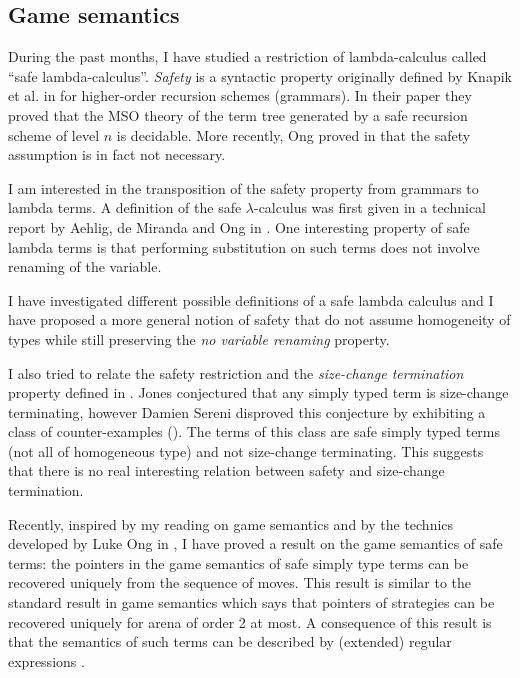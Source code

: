 %

\subsection{Game semantics}

During the past months, I have studied a restriction of
lambda-calculus called ``safe lambda-calculus''. \emph{Safety} is a
syntactic property originally defined by Knapik et al. in
\cite{KNU02} for higher-order recursion schemes (grammars). In their
paper they proved that the MSO theory of the term tree generated by
a safe recursion scheme of level $n$ is decidable. More recently,
Ong proved in \cite{OngLics2006} that the safety assumption is in
fact not necessary.

I am interested in the transposition of the safety property from
grammars to lambda terms. A definition of the safe
$\lambda$-calculus was first given in a technical report by Aehlig,
de Miranda and Ong in \cite{safety-mirlong2004}. One interesting
property of safe lambda terms is that performing substitution on
such terms does not involve renaming of the variable.

I have investigated different possible definitions of a safe lambda
calculus and I have proposed a more general notion of safety that do
not assume homogeneity of types while still preserving  the \emph{no
variable renaming} property.

I also tried to relate the safety restriction and the
\emph{size-change termination} property defined in
\cite{jones01,jones04}. Jones conjectured that any simply typed term
is size-change terminating, however Damien Sereni disproved this
conjecture by exhibiting a class of counter-examples
(\cite{serenistypesct05}). The terms of this class are safe simply
typed terms (not all of homogeneous type) and not size-change
terminating. This suggests that there is no real interesting
relation between safety and size-change termination.


Recently, inspired by my reading on game semantics
\citep{abramsky:game-semantics} and by the technics developed by
Luke Ong in \citep{OngLics2006}, I have proved a result on the game
semantics of safe terms: the pointers in the game semantics of safe
simply type terms can be recovered uniquely from the sequence of
moves. This result is similar to the standard result in game
semantics which says that pointers of strategies can be recovered
uniquely for arena of order 2 at most. A consequence of this result
is that the semantics of such terms can be described by (extended)
regular expressions \cite{ghicamccusker00}.


